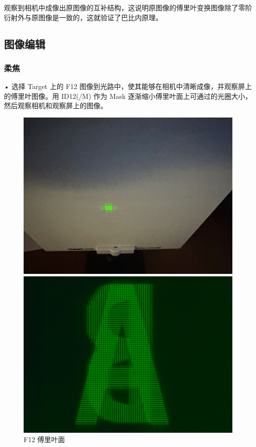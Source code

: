\documentclass{ctexart}
\begin{document}
观察到相机中成像出原图像的互补结构，这说明原图像的傅里叶变换图像除了零阶衍射外与原图像是一致的，这就验证了巴比内原理。

\subsection{图像编辑}
\subsubsection{柔焦}
• 选择 Target 上的 F12 图像到光路中，使其能够在相机中清晰成像，并观察屏上的傅里叶图像。用 ID12(/M) 作为 Mask 逐渐缩小傅里叶面上可通过的光圈大小，然后观察相机和观察屏上的图像。
\begin{figure}[H]
  \centering
  \begin{minipage}[b]{0.2\textwidth}
    \centering
    \includegraphics[width=\textwidth]{pictures/微信图片_20241017164739.jpg}
    \caption{F12 傅里叶面}
  \end{minipage}
  \hspace{0.05\textwidth} %
  \begin{minipage}[b]{0.2\textwidth}
    \centering
    \includegraphics[width=\textwidth]{pictures/F12-nomask-Ex26.png}

\end{minipage}
\end{figure}
\end{document}
